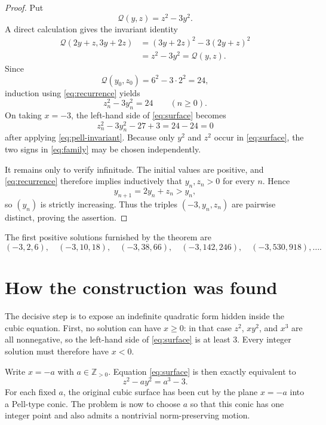 \documentclass[10pt]{article}
\newcommand{\Z}{\mathbb Z}
\newcommand{\Qform}{\mathcal Q}
\begin{document}
\begin{proof}
Put
\[
 \Qform(y,z)=z^2-3y^2.
\]
A direct calculation gives the invariant identity
\begin{align*}
 \Qform(2y+z,3y+2z)
 &=(3y+2z)^2-3(2y+z)^2\\
 &=z^2-3y^2
 =\Qform(y,z).
\end{align*}
Since
\[
 \Qform(y_0,z_0)=6^2-3\cdot2^2=24,
\]
induction using \eqref{eq:recurrence} yields
\begin{equation}\label{eq:pell-invariant}
 z_n^2-3y_n^2=24
 \qquad(n\ge0).
\end{equation}
On taking $x=-3$, the left-hand side of \eqref{eq:surface} becomes
\[
 z_n^2-3y_n^2-27+3
 =24-24=0
\]
after applying \eqref{eq:pell-invariant}.  Because only $y^2$ and $z^2$ occur in \eqref{eq:surface}, the two signs in \eqref{eq:family} may be chosen independently.

It remains only to verify infinitude.  The initial values are positive, and \eqref{eq:recurrence} therefore implies inductively that $y_n,z_n>0$ for every $n$.  Hence
\[
 y_{n+1}=2y_n+z_n>y_n,
\]
so $(y_n)$ is strictly increasing.  Thus the triples $(-3,y_n,z_n)$ are pairwise distinct, proving the assertion.
\end{proof}

The first positive solutions furnished by the theorem are
\[
 (-3,2,6),\quad(-3,10,18),\quad(-3,38,66),\quad
 (-3,142,246),\quad(-3,530,918),\ldots.
\]

\section{How the construction was found}\label{sec:discovery}

The decisive step is to expose an indefinite quadratic form hidden inside the cubic equation.  First, no solution can have $x\ge0$: in that case $z^2$, $xy^2$, and $x^3$ are all nonnegative, so the left-hand side of \eqref{eq:surface} is at least $3$.  Every integer solution must therefore have $x<0$.

Write $x=-a$ with $a\in\Z_{>0}$.  Equation \eqref{eq:surface} is then exactly equivalent to
\begin{equation}\label{eq:slices}
 z^2-ay^2=a^3-3.
\end{equation}
For each fixed $a$, the original cubic surface has been cut by the plane $x=-a$ into a Pell-type conic.  The problem is now to choose $a$ so that this conic has one integer point and also admits a nontrivial norm-preserving motion.
\end{document}

